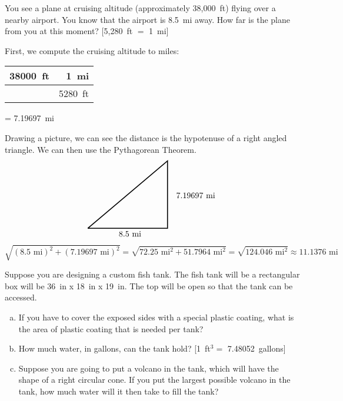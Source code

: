 \documentclass[11pt,letterpaper]{article}
\begin{document}
\newpage



 You see a plane at cruising altitude (approximately 38,000~ft) flying over a nearby airport. You know that the airport is 8.5~mi away. How far is the plane from you at this moment? [5,280~ft $=$ 1~mi] \pspace

\sol First, we compute the cruising altitude to miles: \par
	\begin{table}[!ht]
	\centering
	\begin{tabular}{r|r}
	38000~ft  & 1~mi \\ \hline
			& 5280~ft
	\end{tabular}
	= 7.19697~mi
	\end{table}
Drawing a picture, we can see the distance is the hypotenuse of a right angled triangle. We can then use the Pythagorean Theorem.
	\[
	\begin{tikzpicture}[scale=0.4]
	\draw[line width=0.04cm] (0,0) -- (8.5,0) -- (8.5,7.19697) -- (0,0);
	\node at (4.5,-0.6) {8.5~mi};
	\node at (11.5,3.5) {7.19697~mi};
	\end{tikzpicture}
	\]
	\[
	\sqrt{(8.5 \text{ mi})^2 + (7.19697 \text{ mi})^2}= \sqrt{72.25 \text{ mi}^2 + 51.7964 \text{ mi}^2}= \sqrt{124.046 \text{ mi}^2} \approx 11.1376 \text{ mi}
	\]



\newpage



 Suppose you are designing a custom fish tank. The fish tank will be a rectangular box will be 36~in x 18~in x 19~in. The top will be open so that the tank can be accessed. 
	\begin{enumerate}[(a)]
	\item If you have to cover the exposed sides with a special plastic coating, what is the area of plastic coating that is needed per tank?
	\item How much water, in gallons, can the tank hold? [1~ft$^3 =$ 7.48052~gallons]
	\item Suppose you are going to put a volcano in the tank, which will have the shape of a right circular cone. If you put the largest possible volcano in the tank, how much water will it then take to fill the tank?
	\end{enumerate} \pspace
\end{document}
